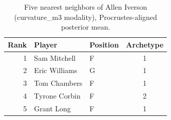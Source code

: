 \begin{table}[htbp]
  \centering\small
  \begin{tabular}{rllc}
    \toprule
    Rank & Player & Position & Archetype \\
    \midrule
    1 & Sam Mitchell & F & 1 \\
    2 & Eric Williams & G & 1 \\
    3 & Tom Chambers & F & 1 \\
    4 & Tyrone Corbin & F & 2 \\
    5 & Grant Long & F & 1 \\
    \bottomrule
  \end{tabular}
  \caption{Five nearest neighbors of Allen Iverson (curvature_m3 modality), Procrustes-aligned posterior mean.}
  \label{tab:Allen_Iverson_neighbors_curvature_m3}
\end{table}

